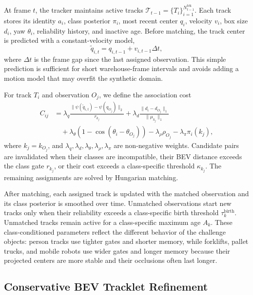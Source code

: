 \documentclass[runningheads]{llncs}
\begin{document}
At frame $t$, the tracker maintains active tracks
$\mathcal{T}_{t-1}=\{T_i\}_{i=1}^{N^{\mathrm{trk}}_{t-1}}$. Each track stores its identity
$a_i$, class posterior $\pi_i$, most recent center $q_i$, velocity $v_i$, box size
$d_i$, yaw $\theta_i$, reliability history, and inactive age. Before matching, the
track center is predicted with a constant-velocity model,
\begin{equation}
    \tilde{q}_{i,t}=q_{i,t-1}+v_{i,t-1}\Delta t,
    \label{eq:track_prediction}
\end{equation}
where $\Delta t$ is the frame gap since the last assigned observation. This simple
prediction is sufficient for short warehouse-frame intervals and avoids adding a
motion model that may overfit the synthetic domain.

For track $T_i$ and observation $O_j$, we define the association cost
\begin{equation}
\begin{aligned}
    C_{ij}
    &=
    \lambda_q
    \frac{\|\psi(\tilde{q}_{i,t})-\psi(q_{O_j})\|_2}{r_{k_j}}
    +
    \lambda_d
    \frac{\|d_i-d_{O_j}\|_1}{\|\mu_{k_j}\|_1}  \\
    &\quad
    +
    \lambda_{\theta}
    \left(1-\cos(\theta_i-\theta_{O_j})\right)
    -
    \lambda_{\rho}\rho_{O_j}
    -
    \lambda_{\pi}\pi_i(k_j),
\end{aligned}
    \label{eq:association_cost}
\end{equation}
where $k_j=k_{O_j}$, and
$\lambda_q,\lambda_d,\lambda_{\theta},\lambda_{\rho},\lambda_{\pi}$ are
non-negative weights. Candidate pairs are invalidated when their classes are
incompatible, their BEV distance exceeds the class gate $r_{k_j}$, or their cost
exceeds a class-specific threshold $\kappa_{k_j}$. The remaining assignments are
solved by Hungarian matching.

After matching, each assigned track is updated with the matched observation and its
class posterior is smoothed over time. Unmatched observations start new tracks only
when their reliability exceeds a class-specific birth threshold $\tau^{\mathrm{birth}}_k$.
Unmatched tracks remain active for a class-specific maximum age $A_k$. These class-conditioned
parameters reflect the different behavior of the challenge objects: person tracks
use tighter gates and shorter memory, while forklifts, pallet trucks, and mobile
robots use wider gates and longer memory because their projected centers are more
stable and their occlusions often last longer.

\subsection{Conservative BEV Tracklet Refinement}
\label{sec:method_bev_refinement}
\end{document}
